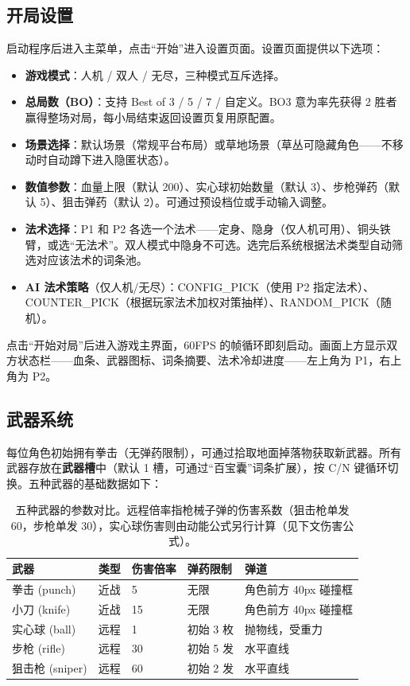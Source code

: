 \documentclass[utf8]{ctexart}
\begin{document}
\subsection{开局设置}

启动程序后进入主菜单，点击“开始”进入设置页面。设置页面提供以下选项：

\begin{itemize}
  \item \textbf{游戏模式}：人机 / 双人 / 无尽，三种模式互斥选择。
  \item \textbf{总局数（BO）}：支持 Best of 3 / 5 / 7 / 自定义。BO3 意为率先获得 2 胜者赢得整场对局，每小局结束返回设置页复用原配置。
  \item \textbf{场景选择}：默认场景（常规平台布局）或草地场景（草丛可隐藏角色——不移动时自动蹲下进入隐匿状态）。
  \item \textbf{数值参数}：血量上限（默认 200）、实心球初始数量（默认 3）、步枪弹药（默认 5）、狙击弹药（默认 2）。可通过预设档位或手动输入调整。
  \item \textbf{法术选择}：P1 和 P2 各选一个法术——定身、隐身（仅人机可用）、铜头铁臂，或选“无法术”。双人模式中隐身不可选。选完后系统根据法术类型自动筛选对应该法术的词条池。
  \item \textbf{AI 法术策略}（仅人机/无尽）：CONFIG\_PICK（使用 P2 指定法术）、COUNTER\_PICK（根据玩家法术加权对策抽样）、RANDOM\_PICK（随机）。
\end{itemize}

点击“开始对局”后进入游戏主界面，60FPS 的帧循环即刻启动。画面上方显示双方状态栏——血条、武器图标、词条摘要、法术冷却进度——左上角为 P1，右上角为 P2。

\subsection{武器系统}

每位角色初始拥有拳击（无弹药限制），可通过拾取地面掉落物获取新武器。所有武器存放在\textbf{武器槽}中（默认 1 槽，可通过“百宝囊”词条扩展），按 C/N 键循环切换。五种武器的基础数据如下：

\begin{table}[H]
\centering
\begin{tabular}{p{2cm}p{1.8cm}p{1.8cm}p{2cm}p{2.8cm}}
\toprule
\textbf{武器} & \textbf{类型} & \textbf{伤害倍率} & \textbf{弹药限制} & \textbf{弹道} \\
\midrule
拳击 (punch) & 近战 & 5 & 无限 & 角色前方 40px 碰撞框 \\
小刀 (knife) & 近战 & 15 & 无限 & 角色前方 40px 碰撞框 \\
实心球 (ball) & 远程 & 1 & 初始 3 枚 & 抛物线，受重力 \\
步枪 (rifle) & 远程 & 30 & 初始 5 发 & 水平直线 \\
狙击枪 (sniper) & 远程 & 60 & 初始 2 发 & 水平直线 \\
\bottomrule
\end{tabular}
\caption{五种武器的参数对比。远程倍率指枪械子弹的伤害系数（狙击枪单发 60，步枪单发 30），实心球伤害则由动能公式另行计算（见下文伤害公式）。}
\end{table}
\end{document}

